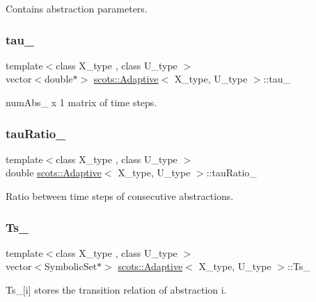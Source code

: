 Contains abstraction parameters. \mbox{\label{classscots_1_1Adaptive_a2276dbf06b4db12739aed70443c1a32d}} 
\subsubsection{\texorpdfstring{tau\+\_\+}{tau\_}}
{\footnotesize\ttfamily template$<$class X\+\_\+type , class U\+\_\+type $>$ \\
vector$<$double$\ast$$>$ \hyperlink{classscots_1_1Adaptive}{scots\+::\+Adaptive}$<$ X\+\_\+type, U\+\_\+type $>$\+::tau\+\_\+}

num\+Abs\+\_\+ x 1 matrix of time steps. \mbox{\label{classscots_1_1Adaptive_a33592a853774854552908de4762f8f8c}} 
\subsubsection{\texorpdfstring{tau\+Ratio\+\_\+}{tauRatio\_}}
{\footnotesize\ttfamily template$<$class X\+\_\+type , class U\+\_\+type $>$ \\
double \hyperlink{classscots_1_1Adaptive}{scots\+::\+Adaptive}$<$ X\+\_\+type, U\+\_\+type $>$\+::tau\+Ratio\+\_\+}

Ratio between time steps of consecutive abstractions. \mbox{\label{classscots_1_1Adaptive_ab9f37fda9e698b797079d28b243f3a5b}} 
\subsubsection{\texorpdfstring{Ts\+\_\+}{Ts\_}}
{\footnotesize\ttfamily template$<$class X\+\_\+type , class U\+\_\+type $>$ \\
vector$<$Symbolic\+Set$\ast$$>$ \hyperlink{classscots_1_1Adaptive}{scots\+::\+Adaptive}$<$ X\+\_\+type, U\+\_\+type $>$\+::Ts\+\_\+}

Ts\+\_\+\mbox{[}i\mbox{]} stores the transition relation of abstraction i. \mbox{\label{classscots_1_1Adaptive_a1f4c02094ecd380887640c83fc1d0310}} 
